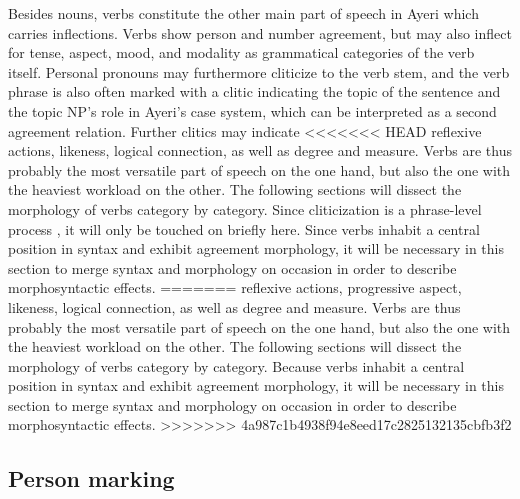Besides nouns, verbs constitute the other main part of speech in Ayeri which
carries inflections. Verbs show person and number agreement, but may also
inflect for tense, aspect, mood, and modality as grammatical categories of the
verb itself. Personal pronouns may furthermore cliticize to the verb stem, and
the verb phrase is also often marked with a clitic indicating the topic of the
sentence and the topic NP's role in Ayeri's case system, which can be
interpreted as a second agreement relation. Further clitics may indicate
<<<<<<< HEAD
reflexive actions, likeness, logical connection, as well as degree and measure.
Verbs are thus probably the most versatile part of speech on the one hand, but
also the one with the heaviest workload on the other. The following sections
will dissect the morphology of verbs category by category. Since cliticization
is a phrase-level process \citep{klavans1985}, it will only be touched on
briefly here. Since verbs inhabit a central position in syntax and exhibit
agreement morphology, it will be necessary in this section to merge syntax and
morphology on occasion in order to describe morphosyntactic effects.
=======
reflexive actions, progressive aspect, likeness, logical connection, as well
as degree and measure. Verbs are thus probably the most versatile part of
speech on the one hand, but also the one with the heaviest workload on the
other. The following sections will dissect the morphology of verbs category by
category.
Because verbs inhabit a central 
position in syntax and exhibit agreement morphology, it will be necessary in
this section to merge syntax and morphology on occasion in order to describe
morphosyntactic effects.
>>>>>>> 4a987c1b4938f94e8eed17c2825132135cbfb3f2

\subsection{Person marking}
\label{subsec:persnumagr}

